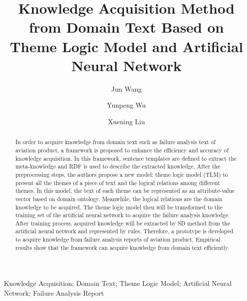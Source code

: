 \documentclass{elsarticle}
\begin{document}
\begin{frontmatter}


\title{Knowledge Acquisition Method from Domain Text Based on Theme Logic Model and Artificial Neural Network }


\author[buaa]{Jun Wang}
\author[buaa]{Yunpeng Wu}
\author[buaa]{Xuening Liu}





\address[buaa]{School of Economics \& Management, Beihang University, Beijing 100083,
P.R. China }


\begin{abstract}
In order to acquire knowledge from domain text such as failure
analysis text of aviation product, a framework is proposed to enhance
the efficiency and accuracy of knowledge acquisition. In this
framework, sentence templates are defined to extract the
meta-knowledge and RDF is used to describe the extracted knowledge.
After the preprocessing steps, the authors propose a new model: theme logic
model (TLM) to present all the themes of a piece of text and the logical
relations among different themes. In this model, the text of each
theme can be represented as an attribute-value vector based on domain
ontology. Meanwhile, the logical relations are the domain knowledge to be
acquired. The theme logic model then will be transformed to the
training set of the artificial neural network to acquire the failure
analysis knowledge. After training process, acquired knowledge will be extracted by SD method from the artificial neural network and represented by rules. Therefore, a prototype is developed to acquire knowledge from failure analysis reports of aviation product. Empirical results show that the framework can acquire knowledge from domain text efficiently.
\end{abstract}

\begin{keyword}


Knowledge Acquisition; Domain Text; Theme Logic Model; Artificial Neural Network; Failure Analysis Report


\end{keyword}

\end{frontmatter}
\end{document}
